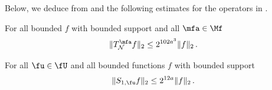 Below, we deduce  from  and the following estimates for the operators in .

\begin{lemma}
    \label{nontangential-operator-bound}
    \leanok
    For all bounded $f$ with bounded support and all $\mfa \in \Mf$
    $$
        \|T_{\mathcal{N}}^{\mfa} f\|_2 \le 2^{102a^3} \|f\|_2\,.
    $$
\end{lemma}

\begin{lemma}
    \label{boundary-operator-bound}
    \leanok
    For all $\fu \in \fU$ and all bounded functions $f$ with bounded support
    \begin{equation}
        \label{eq-S-bound}
        \|S_{1,\fu}f\|_2 \le 2^{12a} \|f\|_2\,.
    \end{equation}
\end{lemma}

